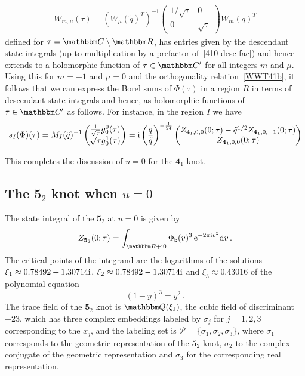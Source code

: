 \documentclass[12pt,reqno]{amsart}
\theoremstyle{definition}
\def\BQ{\mathbbm Q}
\def\BR{\mathbbm R}
\def\BC{\mathbbm C}
\def\calP{\mathcal P}
\def\s{\sigma}
\def\tq{\tilde{q}}
\def\bb{\mathsf{b}}
\def\ri{\mathrm{i}}
\def\rd{\mathrm{d}}
\def\re{{\rm e}}
\def\ri{{\rm i}}
\def\rd{{\rm d}}
\def\md{\mathbf}
\newcommand{\knot}[1]{\md{#1}}
\begin{document}
\begin{align}
  \label{W410-desc}
  W_{m,\mu}(\tau) = 
    (W_\mu(\tq)^T)^{-1}
    \begin{pmatrix}
      1/\sqrt{\tau} & 0 \\ 0 & \sqrt{\tau}
    \end{pmatrix} W_m(q)^T
\end{align}
defined for $\tau=\BC\setminus\BR$, has entries given by the
descendant state-integrals (up to multiplication by a prefactor
of~\eqref{410-desc-fac})
and hence extends to a holomorphic function of $\tau \in \BC'$ for all
integers $m$ and $\mu$. Using this for $m=-1$ and $\mu=0$ and the
orthogonality relation~\eqref{WWT41b}, it follows that we can express
the Borel sums of $\Phi(\tau)$ in a region $R$ in terms of descendant
state-integrals and hence, as holomorphic functions of $\tau \in \BC'$
as follows. For instance, in the region $I$ we have
\begin{equation}
  s_I(\Phi)(\tau) = M_I(\tq)^{-1}
  \begin{pmatrix}
    \frac{1}{\sqrt{\tau}} g^0_0(\tau) \\
    \sqrt{\tau} g^1_0(\tau)
  \end{pmatrix}
  = \ri\left(\frac{q}{\tq}\right)^{-\frac{1}{24}}
  \begin{pmatrix}
    Z_{\knot{4}_1,0,0}(0;\tau) -\tq^{1/2} Z_{\knot{4}_1,0,-1}(0;\tau) \\ 
    Z_{\knot{4}_1,0,0}(0;\tau)
\end{pmatrix}
\end{equation}
  
This completes the discussion of $u=0$ for the $\knot{4}_1$ knot.

\subsection{The $\knot{5}_2$ knot when $u=0$}
\label{sub.52x=1}

The state integral of the $\knot{5}_2$ at $u=0$ is given by
\begin{equation}
  \label{Z520}
  Z_{\knot{5}_2}(0;\tau) = 
  \int_{\BR+\ri 0} \Phi_\bb(v)^3 \, \re^{-2\pi \ri v^2} \rd v \,.
\end{equation}
The critical points of the integrand are the logarithms of the
solutions $\xi_1 \approx 0.78492 + 1.30714 \ri$,
$\xi_2 \approx 0.78492 - 1.30714 \ri$ and $\xi_3 \approx 0.43016$ of
the polynomial equation
\begin{equation}
  \label{52xi}
  (1-y)^3=y^2 \,.
\end{equation}
The trace field of the $\knot{5}_2$ knot is $\BQ(\xi_1)$, the cubic
field of discriminant $-23$, which has three complex embeddings
labeled by $\s_j$ for $j=1,2,3$ corresponding to the $x_j$, and the
labeling set is $\calP=\{\s_1,\s_2,\s_3\}$, where $\s_1$ corresponds
to the geometric representation of the $\knot{5}_2$ knot, $\s_2$ to
the complex conjugate of the geometric representation and $\s_3$ for
the corresponding real representation.
\end{document}
